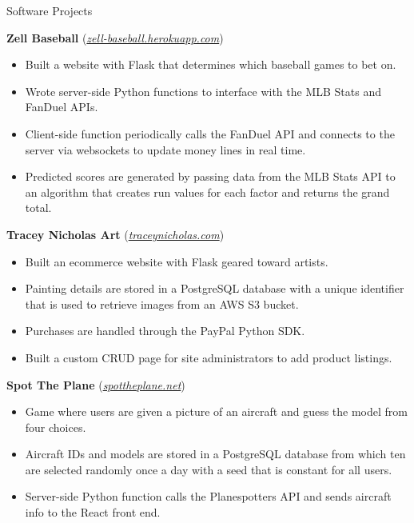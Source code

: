 \documentclass[calibri]{mcdowellcv}
\begin{document}
	\begin{cvsection}{Software Projects}
		\begin{cvsubsection}{}{}{}
			\textbf{Zell Baseball} (\textit{{\color{blue}\href{https://zell-baseball.herokuapp.com/}{zell-baseball.herokuapp.com}}})
			\begin{itemize}
				\item Built a website with Flask that determines which baseball games to bet on.
				\item Wrote server-side Python functions to interface with the MLB Stats and FanDuel APIs.
				\item Client-side function periodically calls the FanDuel API and connects to the server via websockets to update money lines in real time.
    			\item Predicted scores are generated by passing data from the MLB Stats API to an algorithm that creates run values for each factor and returns the grand total. 
			\end{itemize}
		\end{cvsubsection}

		\begin{cvsubsection}{}{}{}
			\textbf{Tracey Nicholas Art} (\textit{{\color{blue}\href{https://www.traceynicholas.com/}{traceynicholas.com}}})
			\begin{itemize}
				\item Built an ecommerce website with Flask geared toward artists.
				\item Painting details are stored in a PostgreSQL database with a unique identifier that is used to retrieve images from an AWS S3 bucket.
				\item Purchases are handled through the PayPal Python SDK.
				\item Built a custom CRUD page for site administrators to add product listings.
			\end{itemize}
		\end{cvsubsection}

		\begin{cvsubsection}{}{}{}
			\textbf{Spot The Plane} (\textit{{\color{blue}\href{https://www.spottheplane.net/}{spottheplane.net}}})
			\begin{itemize}
				\item Game where users are given a picture of an aircraft and guess the model from four choices.
				\item Aircraft IDs and models are stored in a PostgreSQL database from which ten are selected randomly once a day with a seed that is constant for all users.
    			\item Server-side Python function calls the Planespotters API and sends aircraft info to the React front end.
			\end{itemize}
		\end{cvsubsection}
	\end{cvsection}
	
\end{document}
